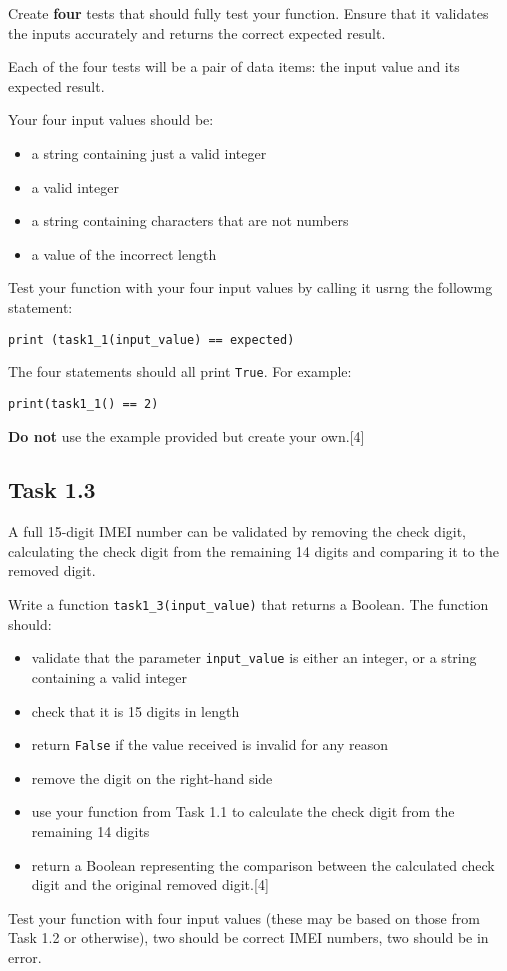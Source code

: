 Create \textbf{four} tests that should fully test your function. Ensure
that it validates the inputs accurately and returns the correct expected
result. 

Each of the four tests will be a pair of data items: the input value
and its expected result.

Your four input values should be: 
\begin{itemize}
\item a string containing just a valid integer 
\item a valid integer 
\item a string containing characters that are not numbers 
\item a value of the incorrect length
\end{itemize}
Test your function with your four input values by calling it usrng
the followmg statement:

\texttt{\qquad{}print (task1\_1(input\_value) == expected) }

The four statements should all print \texttt{True}. For example:

\texttt{\qquad{}print(task1\_1(\textquotedbl )
== 2)}

\textbf{Do not} use the example provided but create your own.\hfill{}{[}4{]}

\subsection*{Task 1.3 }

A full 15-digit IMEI number can be validated by removing the check
digit, calculating the check digit from the remaining 14 digits and
comparing it to the removed digit. 

Write a function \texttt{task1\_3(input\_value)} that returns a Boolean.
The function should: 
\begin{itemize}
\item validate that the parameter \texttt{input\_value} is either an integer,
or a string containing a valid integer 
\item check that it is 15 digits in length 
\item return \texttt{False} if the value received is invalid for any reason 
\item remove the digit on the right-hand side 
\item use your function from Task 1.1 to calculate the check digit from
the remaining 14 digits 
\item return a Boolean representing the comparison between the calculated
check digit and the original removed digit.\hfill{}{[}4{]}
\end{itemize}
Test your function with four input values (these may be based on those
from Task 1.2 or otherwise), two should be correct IMEI numbers, two
should be in error. 

